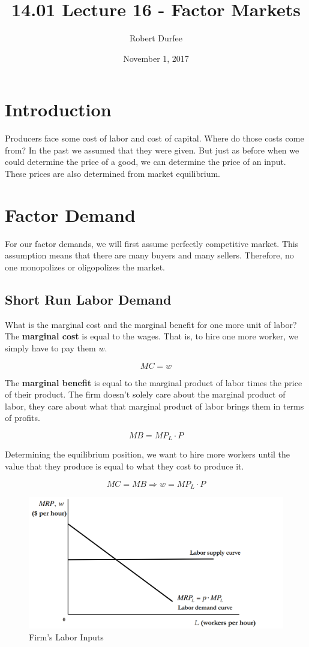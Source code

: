\documentclass{article}
\title{14.01 Lecture 16 - Factor Markets}
\author{Robert Durfee}
\date{November 1, 2017}
\begin{document}
\maketitle

\section{Introduction}

Producers face some cost of labor and cost of capital. Where do those costs come
from? In the past we assumed that they were given. But just as before when we
could determine the price of a good, we can determine the price of an input.
These prices are also determined from market equilibrium. 

\section{Factor Demand}

For our factor demands, we will first assume perfectly competitive market. This
assumption means that there are many buyers and many sellers. Therefore, no one
monopolizes or oligopolizes the market.

\subsection{Short Run Labor Demand}

What is the marginal cost and the marginal benefit for one more unit of labor?
The \textbf{marginal cost} is equal to the wages. That is, to hire one more
worker, we simply have to pay them $w$.

$$MC=w$$

The \textbf{marginal benefit} is equal to the marginal product of labor times
the price of their product. The firm doesn't solely care about the marginal
product of labor, they care about what that marginal product of labor brings
them in terms of profits.

$$MB=MP_{L}\cdot P$$

Determining the equilibrium position, we want to hire more workers until the
value that they produce is equal to what they cost to produce it.


$$MC=MB\Rightarrow w=MP_{L}\cdot P$$

\begin{figure}
    \centering
    \includegraphics[scale=0.33]{"Figure 16-1"}
    \caption{Firm's Labor Inputs}
\end{figure}
\end{document}
